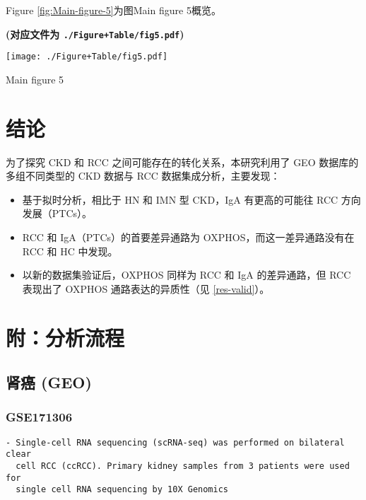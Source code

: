 \documentclass[
]{article}
\providecommand{\tightlist}{%
  \setlength{\itemsep}{0pt}\setlength{\parskip}{0pt}}
\begin{document}
Figure \ref{fig:Main-figure-5}为图Main figure 5概览。

\textbf{(对应文件为 \texttt{./Figure+Table/fig5.pdf})}

\def\@captype{figure}
\begin{center}
\texttt{[image: ./Figure+Table/fig5.pdf]}
\caption{Main figure 5}\label{fig:Main-figure-5}
\end{center}

\hypertarget{dis}{%
\section{结论}\label{dis}}

为了探究 CKD 和 RCC 之间可能存在的转化关系，本研究利用了 GEO 数据库的多组不同类型的 CKD 数据与 RCC 数据集成分析，主要发现：

\begin{itemize}
\tightlist
\item
  基于拟时分析，相比于 HN 和 IMN 型 CKD，IgA 有更高的可能往 RCC 方向发展（PTCs）。
\item
  RCC 和 IgA（PTCs）的首要差异通路为 OXPHOS，而这一差异通路没有在 RCC 和 HC 中发现。
\item
  以新的数据集验证后，OXPHOS 同样为 RCC 和 IgA 的差异通路，但 RCC 表现出了 OXPHOS 通路表达的异质性（见 \ref{res-valid}）。
\end{itemize}

\hypertarget{flow}{%
\section{附：分析流程}\label{flow}}

\hypertarget{rcc1}{%
\subsection{肾癌 (GEO)}\label{rcc1}}

\hypertarget{gse171306}{%
\subsubsection{GSE171306}\label{gse171306}}

\begin{verbatim}
- Single-cell RNA sequencing (scRNA-seq) was performed on bilateral clear
  cell RCC (ccRCC). Primary kidney samples from 3 patients were used for
  single cell RNA sequencing by 10X Genomics
\end{verbatim}
\end{document}
